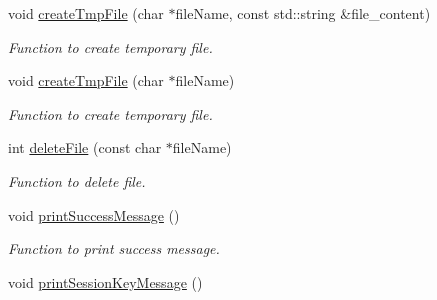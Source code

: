 \begin{DoxyCompactItemize}
void \hyperlink{namespacevishnu_a33f3fca5bc294663e2863c1abc1da5c8}{createTmpFile} (char $\ast$fileName, const std::string \&file\_\-content)
\begin{DoxyCompactList}\small\item\em Function to create temporary file. \item\end{DoxyCompactList}\item 
void \hyperlink{namespacevishnu_a18002572e5b0039069544475365f335d}{createTmpFile} (char $\ast$fileName)
\begin{DoxyCompactList}\small\item\em Function to create temporary file. \item\end{DoxyCompactList}\item 
int \hyperlink{namespacevishnu_adccbbcf352ca9471d210e9d801c73e2d}{deleteFile} (const char $\ast$fileName)
\begin{DoxyCompactList}\small\item\em Function to delete file. \item\end{DoxyCompactList}\item 
\hypertarget{namespacevishnu_ab0ea8ccb86c430f6a602374c82f66d2e}{
void \hyperlink{namespacevishnu_ab0ea8ccb86c430f6a602374c82f66d2e}{printSuccessMessage} ()}
\label{namespacevishnu_ab0ea8ccb86c430f6a602374c82f66d2e}

\begin{DoxyCompactList}\small\item\em Function to print success message. \item\end{DoxyCompactList}\item 
\hypertarget{namespacevishnu_af872d4641cf320df3d2c2102dccbd18e}{
void \hyperlink{namespacevishnu_af872d4641cf320df3d2c2102dccbd18e}{printSessionKeyMessage} ()}
\label{namespacevishnu_af872d4641cf320df3d2c2102dccbd18e}


\end{DoxyCompactItemize}
